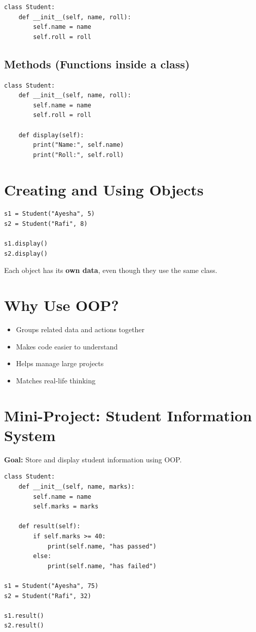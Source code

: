 \begin{verbatim}
class Student:
    def __init__(self, name, roll):
        self.name = name
        self.roll = roll
\end{verbatim}

\subsection{Methods (Functions inside a class)}

\begin{verbatim}
class Student:
    def __init__(self, name, roll):
        self.name = name
        self.roll = roll

    def display(self):
        print("Name:", self.name)
        print("Roll:", self.roll)
\end{verbatim}

\section{Creating and Using Objects}

\begin{verbatim}
s1 = Student("Ayesha", 5)
s2 = Student("Rafi", 8)

s1.display()
s2.display()
\end{verbatim}

Each object has its \textbf{own data}, even though they use the same class.

\section{Why Use OOP?}

\begin{itemize}
    \item Groups related data and actions together
    \item Makes code easier to understand
    \item Helps manage large projects
    \item Matches real-life thinking
\end{itemize}

\section{Mini-Project: Student Information System}

\textbf{Goal:} Store and display student information using OOP.

\begin{verbatim}
class Student:
    def __init__(self, name, marks):
        self.name = name
        self.marks = marks

    def result(self):
        if self.marks >= 40:
            print(self.name, "has passed")
        else:
            print(self.name, "has failed")

s1 = Student("Ayesha", 75)
s2 = Student("Rafi", 32)

s1.result()
s2.result()
\end{verbatim}

